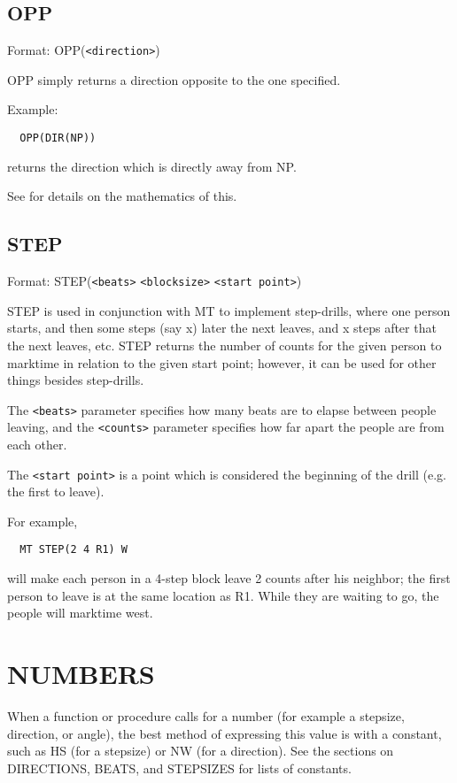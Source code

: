 \subsection{OPP}\label{opp}

Format: OPP(\verb$<direction>$)

OPP simply returns a direction opposite to the one specified.

Example:
\begin{verbatim}
  OPP(DIR(NP))
\end{verbatim}
returns the direction which is directly away from NP.

See  for details on the mathematics of this.

\subsection{STEP}\label{step}

Format: STEP(\verb$<beats>$ \verb$<blocksize>$ \verb$<start point>$)

STEP is used in conjunction with MT to implement step-drills,
where one person starts, and then some steps (say x) later the next leaves,
and x steps after that the next leaves, etc.  STEP returns the number of
counts for the given person to marktime in relation to the given start
point; however, it can be used for other things besides step-drills.

The \verb$<beats>$ parameter specifies how many beats are to elapse between
people leaving, and the \verb$<counts>$ parameter specifies how far apart the
people are from each other.

The \verb$<start point>$ is a point which is considered the beginning of
the drill (e.g. the first to leave).

For example,
\begin{verbatim}
  MT STEP(2 4 R1) W
\end{verbatim}
will make each person in a 4-step block leave 2 counts after his neighbor;
the first person to leave is at the same location as R1.  While they are
waiting to go, the people will marktime west.

\section{NUMBERS}\label{numbers}

When a function or procedure calls for a number (for example a stepsize,
direction, or angle), the best method of expressing this value is with
a constant, such as HS (for a stepsize) or NW (for a direction).
See the sections on DIRECTIONS, BEATS, and STEPSIZES for lists
of constants.

